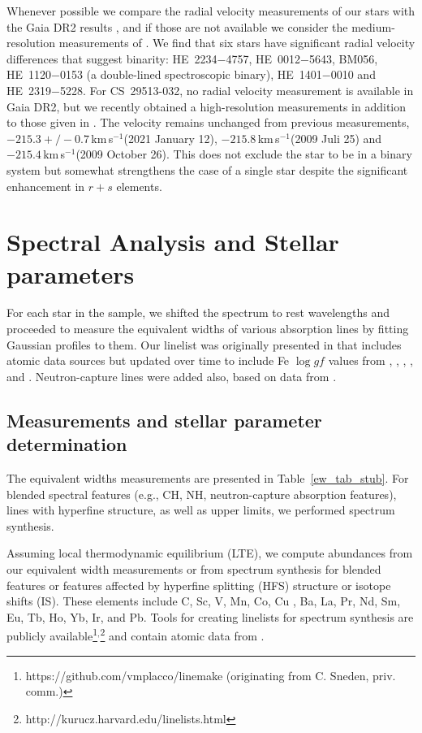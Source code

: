 \documentclass[twocolumn]{aastex63}
\newcommand{\kms}{km\,s$^{-1}$}
\begin{document}
Whenever possible we compare the radial velocity measurements of our stars with the Gaia DR2 results \citep{gaia18}, and if those are not available we consider the medium-resolution measurements of \citet{beers17}. We find that six stars have significant radial velocity differences that suggest binarity: HE~2234$-$4757, HE~0012$-$5643, BM056, HE~1120$-$0153 (a double-lined spectroscopic binary), HE~1401$-$0010 and HE~2319$-$5228. For CS~29513-032, no radial velocity measurement is available in Gaia DR2, but we recently obtained a  high-resolution measurements in addition to those given in \citet{Roederer10}. The velocity remains unchanged from previous measurements, $-215.3 +/- 0.7$\,\kms (2021 January 12), $-215.8$\,\kms (2009 Juli 25) and 
$-215.4$\,\kms (2009 October 26). This does not exclude the star to be in a binary system but somewhat strengthens the case of a single star despite the significant enhancement in $r+s$ elements.


\section{Spectral Analysis and Stellar parameters}\label{sec3}

For each star in the sample, we shifted the spectrum to rest wavelengths and proceeded to measure the equivalent widths of various absorption lines by fitting Gaussian profiles to them. Our linelist was originally presented in \citep{roederer08} that includes atomic data sources but updated over time to include Fe $\log gf$ values from \citet{obrian91}, \citet{kurucz_lines}, \citet{mel09}, \citet{den14}, and \citet{ruf14}.
Neutron-capture lines were added also, based on data from \citet{Hill02,hill17}.

\subsection{Measurements and stellar parameter determination}

The equivalent widths measurements are presented in Table~\ref{ew_tab_stub}. For blended spectral features (e.g., CH, NH, neutron-capture absorption features), lines with hyperfine structure, as well as upper limits, we performed spectrum synthesis.


Assuming local thermodynamic equilibrium (LTE), we compute abundances from our equivalent width measurements or from spectrum synthesis for blended features or features affected by hyperfine splitting (HFS) structure or isotope shifts (IS).
These elements include C, Sc, V, Mn, Co, Cu , Ba, La, Pr, Nd, Sm, Eu, Tb, Ho, Yb, Ir, and Pb. Tools for creating linelists for spectrum synthesis are publicly available\footnote{https://github.com/vmplacco/linemake (originating from C. Sneden, priv. comm.)}$^{,}$\footnote{http://kurucz.harvard.edu/linelists.html} and contain atomic data from \citet{Sneden09, sneden14, Sneden16}. 
\end{document}
